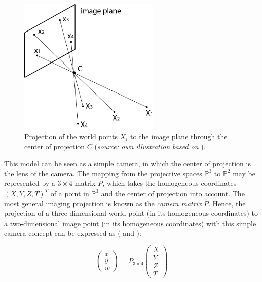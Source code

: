 \begin{figure}[htbp]
		\centering
		\includegraphics[width=0.6\textwidth]{figures/Projection}
		\caption[Projection of the world points $X_i$ to the image plane through $C$]{Projection of the world points $X_i$ to the image plane through the center of projection $C$ (\textit{source: own illustration based on} \cite[p.8]{Hartley.2011}).}
		\label{fig:Projection}
\end{figure}

This model can be seen as a simple camera, in which the center of projection is the lens of the camera. The mapping from the projective spaces $\mathbb{P}^3$ to $\mathbb{P}^2$ may be represented by a $3\times4$ matrix $P$, which takes the homogeneous coordinates $(X,Y,Z,T)^T$ of a point in $\mathbb{P}^3$ and the center of projection into account. The most general imaging projection is known as the \textit{camera matrix} $P$. Hence, the projection of a three-dimensional world point (in its homogeneous coordinates) to a two-dimensional image point (in its homogeneous coordinates) with this simple camera concept can be expressed as (\cite[p.7]{Hartley.2011} and \cite[p.42 et seqq.]{Szeliski.2011}):

\begin{equation} 
 \begin{pmatrix}
  x \\
  y \\
  w
 \end{pmatrix} = P_{3\times4}
 \begin{pmatrix}
  X \\
  Y \\
  Z \\
  T
 \end{pmatrix}\label{eq:camMatrix}
\end{equation}

